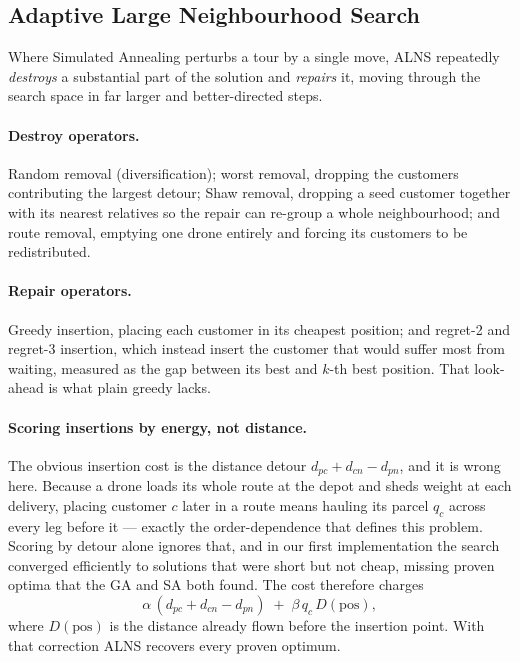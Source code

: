 \documentclass[11pt,a4paper]{article}
\begin{document}
\subsection{Adaptive Large Neighbourhood Search}

Where Simulated Annealing perturbs a tour by a single move, ALNS repeatedly
\emph{destroys} a substantial part of the solution and \emph{repairs} it, moving
through the search space in far larger and better-directed steps.

\paragraph{Destroy operators.} Random removal (diversification); worst removal,
dropping the customers contributing the largest detour; Shaw removal, dropping a
seed customer together with its nearest relatives so the repair can re-group a
whole neighbourhood; and route removal, emptying one drone entirely and forcing
its customers to be redistributed.

\paragraph{Repair operators.} Greedy insertion, placing each customer in its
cheapest position; and regret-2 and regret-3 insertion, which instead insert the
customer that would suffer most from waiting, measured as the gap between its
best and $k$-th best position. That look-ahead is what plain greedy lacks.

\paragraph{Scoring insertions by energy, not distance.}
The obvious insertion cost is the distance detour
$d_{pc}+d_{cn}-d_{pn}$, and it is wrong here. Because a drone loads its whole
route at the depot and sheds weight at each delivery, placing customer $c$ later
in a route means hauling its parcel $q_c$ across every leg before it --- exactly
the order-dependence that defines this problem. Scoring by detour alone ignores
that, and in our first implementation the search converged efficiently to
solutions that were short but not cheap, missing proven optima that the GA and SA
both found. The cost therefore charges
\[
  \alpha\,(d_{pc}+d_{cn}-d_{pn}) \;+\; \beta\, q_c \, D(\text{pos}),
\]
where $D(\text{pos})$ is the distance already flown before the insertion point.
With that correction ALNS recovers every proven optimum.
\end{document}
